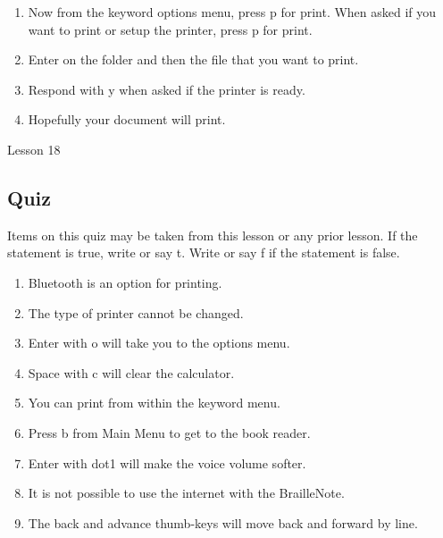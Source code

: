 \documentclass[10pt,letterpaper,twoside]{report}
\begin{document}
{{{{\begin{enumerate}
	\item Now from the keyword options menu, press p for print.  When asked if you want to print or setup the printer, press p for print.
	      
	\item Enter on the folder and then the file that you want to print.
	      
	\item Respond with y when asked if the printer is ready.
	      
	\item Hopefully your document will print.
\end{enumerate}





\clearpage

\newpage
Lesson 18

\subsection{Quiz}



Items on this quiz may be taken from this lesson or any prior lesson.  If the statement is true, write or say t.  Write or say f if the statement is false.



\begin{enumerate}
	\item Bluetooth is an option for printing.
	      
	\item The type of printer cannot be changed.
	      
	\item Enter with o will take you to the options menu.
	      
	\item Space with c will clear the calculator.
	      
	\item You can print from within the keyword menu.
	      
	\item Press b from Main Menu to get to the book reader.
	      
	\item Enter with dot1 will make the voice volume softer.
	      
	\item It is not possible to use the internet with the BrailleNote.
	      
	\item The back and advance thumb-keys will move back and forward by line.
	      

\end{enumerate}}}}}
\end{document}

